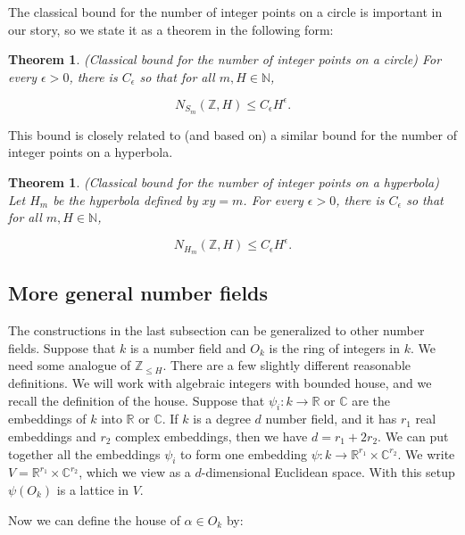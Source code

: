 \documentclass{amsart}
\newtheorem{theorem}[prop]{Theorem}
\newcommand{\CC}{\mathbb{C}}
\newcommand{\eps}{\epsilon}
\newcommand{\ZZ}{\mathbb{Z}}
\newcommand{\RR}{\mathbb{R}}
\newcommand{\NN}{\mathbb{N}}
\begin{document}
The classical bound for the number of integer points on a circle is important in our story,  so we state it as a theorem in the following form:

\begin{theorem} \label{thmclassdiophcircle} (Classical bound for the number of integer points on a circle) For every $\eps > 0$,  there is $C_\eps$ so that for all $m, H \in \NN$,    


$$ N_{S_m}(\ZZ, H) \le C_\eps H^\epsilon.  $$

\end{theorem}

This bound is closely related to (and based on) a similar bound for the number of integer points on a hyperbola.

\begin{theorem} \label{thmclassdiophhyp} (Classical bound for the number of integer points on a hyperbola) Let $H_m$ be the hyperbola defined by $x y = m$.  For every $\eps > 0$,  there is $C_\eps$ so that for all $m, H \in \NN$,    


$$ N_{H_m}(\ZZ, H) \le C_\eps H^\epsilon.  $$

\end{theorem}





\subsection{More general number fields} \label{subsecgenfield}

The constructions in the last subsection can be generalized to other number fields.   Suppose that $k$ is a number field and $O_k$ is the ring of integers in $k$.    We need some analogue of $\ZZ_{\le H}$.   There are a few slightly different reasonable definitions.   We will work with algebraic integers with bounded house,  and we recall the definition of the house.   Suppose that $\psi_i: k \rightarrow \RR$ or $\CC$ are the embeddings of $k$ into $\RR$ or $\CC$.   If $k$ is a degree $d$ number field, and it has $r_1$ real embeddings and $r_2$ complex embeddings, then we have $d = r_1 + 2 r_2$.  We can put together all the embeddings $\psi_i$ to form one embedding $\psi: k \rightarrow \RR^{r_1} \times \CC^{r_2}$.  We write $V = \RR^{r_1} \times \CC^{r_2}$, which we view as a $d$-dimensional Euclidean space.  With this setup $\psi(O_k)$ is a lattice in $V$.  

Now we can define the house of $\alpha \in O_k$ by:
\end{document}
